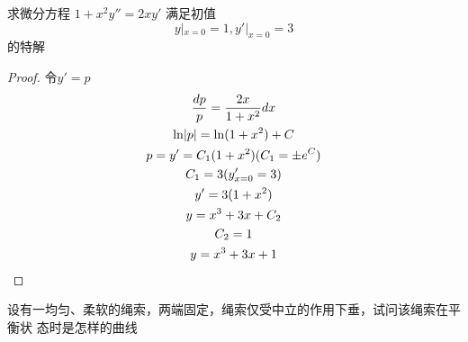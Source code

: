 \documentclass[11pt]{article}
\begin{document}
\begin{proposition}[]
求微分方程
\(1+x^2y''=2xy'\) 满足初值
\begin{equation*}
y|_{x=0}=1,y'|_{x=0}=3
\end{equation*}
的特解
\end{proposition}

\begin{proof}
令\(y'=p\)
\begin{gather*}
\frac{dp}{p}=\frac{2x}{1+x^2}dx\\
\ln\abs{p}=\ln(1+x^2)+C\\
p=y'=C_1(1+x^2) (C_1=\pm e^C)\\
C_1=3(y'_{x=0}=3)\\
y'=3(1+x^2)\\
y=x^3+3x+C_2\\
C_2=1\\
y=x^3+3x+1
\end{gather*}
\end{proof}

\begin{proposition}[]
设有一均匀、柔软的绳索，两端固定，绳索仅受中立的作用下垂，试问该绳索在平衡状
态时是怎样的曲线
\end{proposition}
\end{document}
